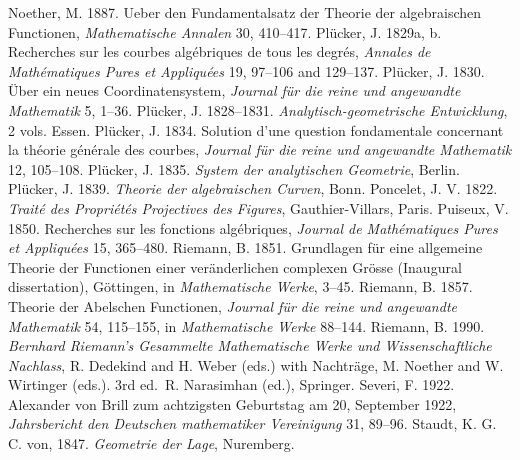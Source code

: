 \newline\indent Noether, M. 1887. Ueber den Fundamentalsatz der Theorie der
algebraischen Functionen,  \emph{Mathematische Annalen} 30, 410--417. 
\newline\indent Pl\"ucker, J. 1829a, b. Recherches sur les courbes alg\'ebriques de tous les degr\'es, \emph{Annales de Math\'e\-matiques Pures et Appliqu\'ees} 19, 97--106 and 129--137.
\newline\indent Pl\"ucker, J. 1830. \"Uber ein neues Coordinatensystem, \emph{Journal f\"ur die reine und angewandte Mathematik} 5, 1--36.
\newline\indent Pl\"ucker, J. 1828--1831.  \emph{Analytisch-geometrische Entwicklung}, 2 vols. Essen. 
\newline\indent Pl\"ucker, J. 1834. Solution d'une question fondamentale concernant la th\'eorie g\'en\'erale des courbes, \emph{Journal f\"ur die reine und angewandte Mathematik} 12, 105--108.
\newline\indent Pl\"ucker, J. 1835. \emph{System der analytischen Geometrie}, Berlin.
\newline\indent Pl\"ucker, J. 1839. \emph{Theorie der algebraischen Curven}, Bonn.
\newline\indent Poncelet, J. V. 1822. \emph{Trait\'{e} des Propri\'{e}t\'{e}s Projectives des Figures}, Gauthier-Villars, Paris.
\newline\indent Puiseux, V. 1850. Recherches sur les fonctions alg\'ebriques, \emph{Journal de Math\'ematiques Pures et Appliqu\'ees} 15, 365--480.
\newline\indent Riemann, B. 1851.  Grundlagen f\"ur eine allgemeine Theorie der Functionen einer ver\-\"anderlichen complexen Gr\"osse (Inaugural dissertation), G\"ottingen, in \emph{Mathematische Werke}, 3--45.
 \newline\indent Riemann, B. 1857.  Theorie der Abelschen Functionen, \emph{Journal f\"ur die reine und angewandte Mathematik}  54, 115--155, in \emph{Mathematische Werke} 88--144.
 \newline\indent  Riemann, B. 1990. \emph{Bernhard Riemann's Gesammelte Mathematische Werke und Wissen\-schaft\-liche Nachlass}, R. Dedekind and  H. Weber (eds.)  with Nach\-tr\"age, M. Noether and W. Wirtinger (eds.). 3rd ed.\ R. Narasimhan (ed.), Springer.
 \newline\indent Severi, F. 1922.  Alexander von Brill zum achtzigsten Geburtstag am 20, September 1922, \emph{Jahrsbericht den Deutschen mathematiker Vereinigung} 31, 89--96.
  \newline\indent Staudt, K. G. C. von, 1847. \emph{Geometrie der Lage}, Nuremberg.
